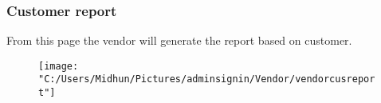 \documentclass{beamer}
\begin{document}
\begin{frame}
	\subsubsection{Customer report}
	From this page the vendor will generate the report based on customer.
	
	\begin{figure}[bph]
		\centering
		\texttt{[image: "C:/Users/Midhun/Pictures/adminsignin/Vendor/vendorcusreport"]}
		\label{fig:admin-signin}
	\end{figure}
	
	
\end{frame}
\end{document}
